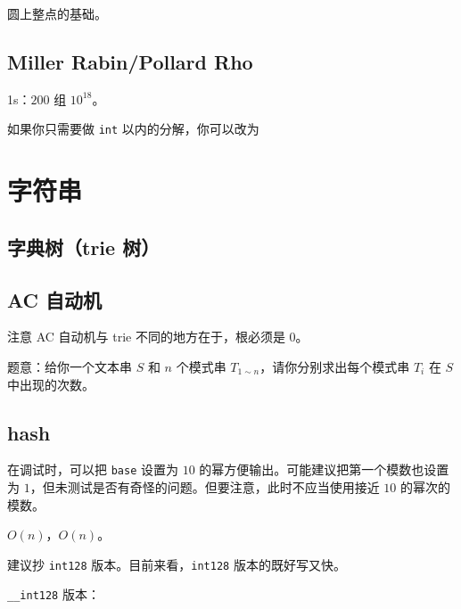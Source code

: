 \documentclass[12pt]{ctexart}
\begin{document}
圆上整点的基础。



\subsection{Miller Rabin/Pollard Rho}

1s：$200$ 组 $10^{18}$。

如果你只需要做 \verb|int| 以内的分解，你可以改为






\newpage

\section{字符串}

\subsection{字典树（trie 树）}



\subsection{AC 自动机}

注意 AC 自动机与 trie 不同的地方在于，根必须是 0。

题意：给你一个文本串 $S$ 和 $n$ 个模式串 $T_{1 \sim n}$，请你分别求出每个模式串 $T_i$ 在 $S$ 中出现的次数。



\subsection{hash}

在调试时，可以把 \verb|base| 设置为 $10$ 的幂方便输出。可能建议把第一个模数也设置为 $1$，但未测试是否有奇怪的问题。但要注意，此时不应当使用接近 $10$ 的幂次的模数。

$O(n)$，$O(n)$。

建议抄 \verb|int128| 版本。目前来看，\verb|int128| 版本的既好写又快。

\verb|__int128| 版本：


\end{document}

